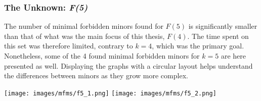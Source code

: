 \subsubsection{The Unknown: \textit{F(5)}}
The number of minimal forbidden minors found for $F(5)$ is significantly smaller than that of what was the main focus of this thesis, $F(4)$. The time spent on this set was therefore limited,  contrary to $k=4$, which was the primary goal. Nonetheless, some of the 4 found minimal forbidden minors for $k=5$ are here presented as well. Displaying the graphs with a circular layout helps understand the differences between minors as they grow more complex.
\vspace{0.5cm}

\texttt{[image: images/mfms/f5\_1.png]}
\texttt{[image: images/mfms/f5\_2.png]}

